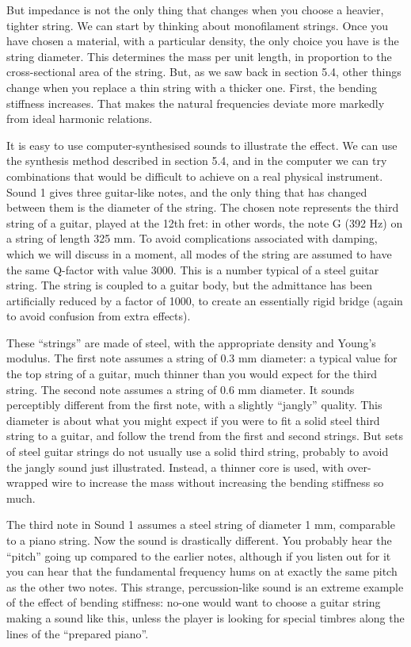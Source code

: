   But impedance is not the only thing that changes when you choose a heavier, 
  tighter string. We can start by thinking about monofilament strings. Once you 
  have chosen a material, with a particular density, the only choice you have 
  is the string diameter. This determines the mass per unit length, in 
  proportion to the cross-sectional area of the string. But, as we saw back in 
  section 5.4, other things change when you replace a thin string with a 
  thicker one. First, the bending stiffness increases. That makes the natural 
  frequencies deviate more markedly from ideal harmonic relations. 

  It is easy to use computer-synthesised sounds to illustrate the effect. We 
  can use the synthesis method described in section 5.4, and in the computer we 
  can try combinations that would be difficult to achieve on a real physical 
  instrument. Sound 1 gives three guitar-like notes, and the only thing that 
  has changed between them is the diameter of the string. The chosen note 
  represents the third string of a guitar, played at the 12th fret: in other 
  words, the note G (392 Hz) on a string of length 325 mm. To avoid 
  complications associated with damping, which we will discuss in a moment, all 
  modes of the string are assumed to have the same Q-factor with value 3000. 
  This is a number typical of a steel guitar string. The string is coupled to a 
  guitar body, but the admittance has been artificially reduced by a factor of 
  1000, to create an essentially rigid bridge (again to avoid confusion from 
  extra effects). 

  These ``strings'' are made of steel, with the appropriate density and Young's 
  modulus. The first note assumes a string of 0.3 mm diameter: a typical value 
  for the top string of a guitar, much thinner than you would expect for the 
  third string. The second note assumes a string of 0.6 mm diameter. It sounds 
  perceptibly different from the first note, with a slightly ``jangly'' 
  quality. This diameter is about what you might expect if you were to fit a 
  solid steel third string to a guitar, and follow the trend from the first and 
  second strings. But sets of steel guitar strings do not usually use a solid 
  third string, probably to avoid the jangly sound just illustrated. Instead, a 
  thinner core is used, with over-wrapped wire to increase the mass without 
  increasing the bending stiffness so much. 

  The third note in Sound 1 assumes a steel string of diameter 1 mm, comparable 
  to a piano string. Now the sound is drastically different. You probably hear 
  the ``pitch'' going up compared to the earlier notes, although if you listen 
  out for it you can hear that the fundamental frequency hums on at exactly the 
  same pitch as the other two notes. This strange, percussion-like sound is an 
  extreme example of the effect of bending stiffness: no-one would want to 
  choose a guitar string making a sound like this, unless the player is looking 
  for special timbres along the lines of the ``prepared piano''. 

